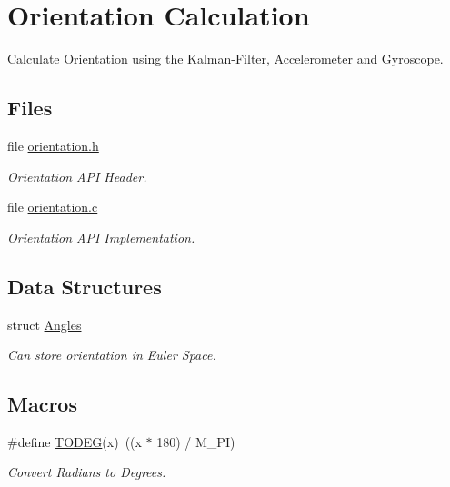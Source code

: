 \hypertarget{group__orientation}{\section{Orientation Calculation}
\label{group__orientation}
}


Calculate Orientation using the Kalman-\/\-Filter, Accelerometer and Gyroscope.  


\subsection*{Files}
\begin{DoxyCompactItemize}
\item 
file \hyperlink{orientation_8h}{orientation.\-h}
\begin{DoxyCompactList}\small\item\em Orientation A\-P\-I Header. \end{DoxyCompactList}\item 
file \hyperlink{orientation_8c}{orientation.\-c}
\begin{DoxyCompactList}\small\item\em Orientation A\-P\-I Implementation. \end{DoxyCompactList}\end{DoxyCompactItemize}
\subsection*{Data Structures}
\begin{DoxyCompactItemize}
\item 
struct \hyperlink{struct_angles}{Angles}
\begin{DoxyCompactList}\small\item\em Can store orientation in Euler Space. \end{DoxyCompactList}\end{DoxyCompactItemize}
\subsection*{Macros}
\begin{DoxyCompactItemize}
\item 
\#define \hyperlink{group__orientation_ga1697ca2f6c35ed996d8653b5b029d283}{T\-O\-D\-E\-G}(x)~((x $\ast$ 180) / M\-\_\-\-P\-I)
\begin{DoxyCompactList}\small\item\em Convert Radians to Degrees. \end{DoxyCompactList}\end{DoxyCompactItemize}
